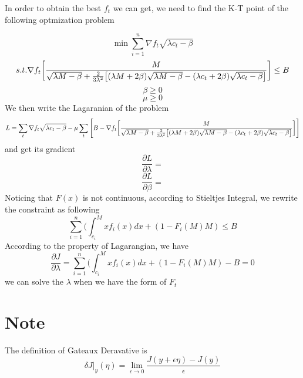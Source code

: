 \documentclass{article}
\begin{document}
In order to obtain the best $f_t$ we can get, we need to find the K-T point of the following optmization problem

\[\min \sum_{i=1}^n \nabla f_t \sqrt{\lambda c_t-\beta}\]
\[s.t. \nabla f_t\bigg[\\
\frac{M}{\sqrt{\lambda M-\beta}+\frac{2}{3\lambda^2}\big[(\lambda M+2\beta)\sqrt{\lambda M-\beta}-(\lambda c_t+2\beta)\sqrt{\lambda c_t-\beta}\big]}\bigg]\leq B\]
\[\beta\geq 0\]
\[\mu\geq 0\]
We then write the Lagaranian of the problem
\[
L=\sum_t \nabla f_t \sqrt{\lambda c_t-\beta}-\mu\sum_t\Bigg[B-\nabla f_t\bigg[\\
\frac{M}{\sqrt{\lambda M-\beta}+\frac{2}{3\lambda^2}\big[(\lambda M+2\beta)\sqrt{\lambda M-\beta}-(\lambda c_t+2\beta)\sqrt{\lambda c_t-\beta}\big]}\bigg]\Bigg]
\]
and get its gradient
\[\frac{\partial L}{\partial \lambda}=\]
\[\frac{\partial L}{\partial \beta}=\]
Noticing that $F(x)$ is not continuous, according to Stieltjes Integral, we rewrite the constraint as following
\[ \sum_{i=1}^n(\int_{c_i}^Mxf_i(x)dx+(1-F_i(M)M)\leq B\]
According to the property of Lagarangian, we have
\[\frac{\partial J}{\partial \lambda}=\sum_{i=1}^n(\int_{c_i}^Mxf_i(x)dx+(1-F_i(M)M)-B=0\]
we can solve the $\lambda$ when we have the form of $F_t$
\section{Note}
The definition of Gateaux Deravative is 
\[\delta J|_y(\eta)=\lim_{\epsilon \to 0} \frac{J(y+\epsilon \eta)-J(y)}{\epsilon}\]
\end{document}
